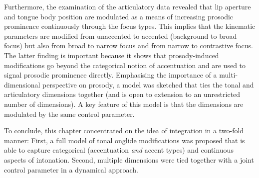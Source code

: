 Furthermore, the examination of the articulatory data revealed that lip aperture and tongue body position are modulated as a means of increasing prosodic prominence continuously through the focus types. This implies that the kinematic parameters are modified from unaccented to accented (background to broad focus) but also from broad to narrow focus and from narrow to contrastive focus. The latter finding is important because it shows that prosody-induced modifications go beyond the categorical notion of accentuation and are used to signal prosodic prominence directly. Emphasising the importance of a multi-dimensional perspective on prosody, a model was sketched that ties the tonal and articulatory dimensions together (and is open to extension to an unrestricted number of dimensions). A key feature of this model is that the dimensions are modulated by the same control parameter.

To conclude, this chapter concentrated on the idea of integration in a two-fold manner: First, a full model of tonal onglide modifications was proposed that is able to capture categorical (accentuation \emph{and} accent types) and continuous aspects of intonation. Second, multiple dimensions were tied together with a joint control parameter in  a dynamical approach.
